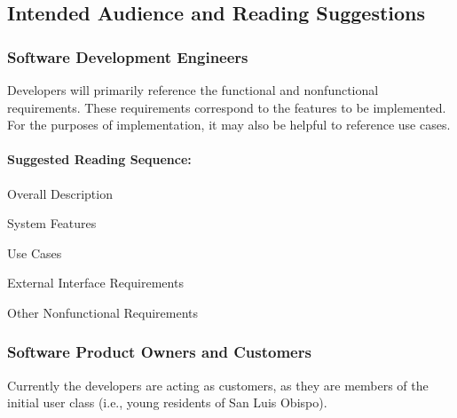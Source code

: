 \documentclass[12pt,oneside,letterpaper]{article}
\newcounter{use_case}
\newcounter{functional_requirement}
\begin{document}
\subsection{Intended Audience and Reading Suggestions}

\subsubsection{Software Development Engineers}
Developers will primarily reference the functional and nonfunctional
requirements. These requirements correspond to the features to be
implemented. For the purposes of implementation, it may also be
helpful to reference use cases.

\paragraph{Suggested Reading Sequence:}
\begin{compactenum}
\item Overall Description
\item System Features
\item Use Cases
\item External Interface Requirements
\item Other Nonfunctional Requirements
\end{compactenum}

\subsubsection{Software Product Owners and Customers}
Currently the developers are acting as customers, as they are members
of the initial user class (i.e., young residents of San Luis Obispo).

\end{document}
